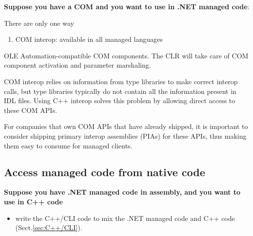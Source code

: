 {\bf Suppose you have a COM and you want to use in .NET managed code}: 



There are only one way
\begin{enumerate}
  \item COM interop: available in all managed languages
\end{enumerate}
OLE Automation-compatible COM components. The CLR will take care of COM
component activation and parameter marshaling. 

COM interop relies on information from type libraries to make correct interop
calls, but type libraries typically do not contain all the information present
in IDL files. Using C++ interop solves this problem by allowing direct access to
these COM APIs.  

For companies that own COM APIs that have already shipped, it is important to
consider shipping primary interop assemblies (PIAs) for these APIs, thus making
them easy to consume for managed clients. 




\subsection{Access managed code from native code}


{\bf Suppose you have .NET managed code in assembly, and you want to use in C++ code}
\begin{itemize}
  \item write the C++/CLI code to mix the .NET managed code and C++ code (Sect.\ref{sec:C++/CLI}).
\end{itemize}


